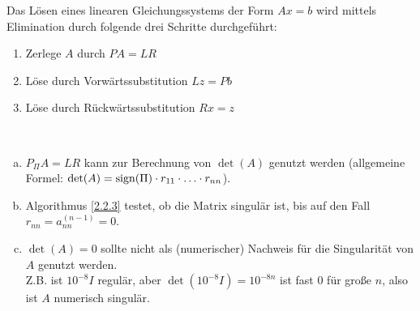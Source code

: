 Das Lösen eines linearen Gleichungssystems der Form $Ax=b$ wird mittels
Elimination durch folgende drei Schritte durchgeführt:
\begin{enumerate}[1)]
\item Zerlege $A$ durch $PA=LR$
\item Löse durch Vorwärtssubstitution $Lz=Pb$
\item Löse durch Rückwärtssubstitution $Rx=z$
\end{enumerate}

\begin{Beme}~
  \begin{enumerate}[a)]
  \item $P_\Pi A=LR$ kann zur Berechnung von $\det(A)$ genutzt werden
    (allgemeine Formel: $\det(A)=\operatorname{sign}(\Pi)\cdot r_{11}\cdot \ldots \cdot r_{nn}$).
  \item Algorithmus \ref{2.2.3}  testet, ob die Matrix singulär ist,
    bis auf den Fall $r_{nn}=a_{nn}^{(n-1)}=0$.
  \item $\det(A)=0$ sollte nicht als (numerischer) Nachweis für die
    Singularität von $A$ genutzt werden.\\
    Z.B. ist $10^{-8}I$ regulär, aber $\det(10^{-8}I) = 10^{-8n}$ ist fast 0
    für große $n$, also ist $A$ numerisch singulär.
  \end{enumerate}
\end{Beme}

